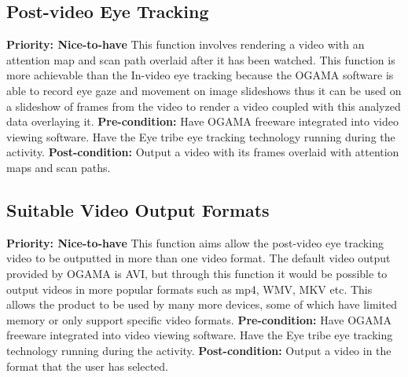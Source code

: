 \subsection{Post-video Eye Tracking}
    \textbf{Priority: Nice-to-have}\newline
    This function involves rendering a video with an attention map and scan path overlaid after it has been watched. This function is more achievable than the In-video eye tracking because the OGAMA software is able to record eye gaze and movement on image slideshows thus it can be used on a slideshow of frames from the video to render a video coupled with this analyzed data overlaying it.\newline
\textbf{Pre-condition: }Have OGAMA freeware integrated into video viewing software. Have the Eye tribe eye tracking technology running during the activity.\newline   
\textbf{Post-condition: }Output a video with its frames overlaid with attention maps and scan paths.

\subsection{Suitable Video Output Formats} 
    \textbf{Priority: Nice-to-have}\newline
    This function aims allow the post-video eye tracking video to be outputted in more than one video format. The default video output provided by OGAMA is AVI, but through this function it would be possible to output videos in more popular formats such as mp4, WMV, MKV etc. This allows the product to be used by many more devices, some of which have limited memory or only support specific video formats.\newline
    \textbf{Pre-condition: }Have OGAMA freeware integrated into video viewing software. Have the Eye tribe eye tracking technology running during the activity.\newline
    \textbf{Post-condition: }Output a video in the format that the user has selected.
